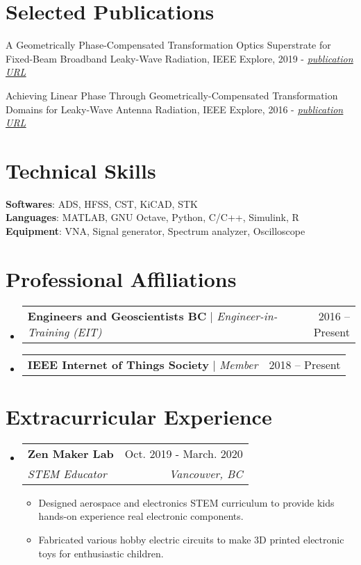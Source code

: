 \documentclass[letterpaper,11pt]{article}
\makeatletter
\newcommand{\resumeItem}[1]{
  \item\small{
    {#1 \vspace{-2pt}}
  }
}
\newcommand{\resumeSubheading}[4]{
  \vspace{-2pt}\item
    \begin{tabular*}{0.97\textwidth}[t]{l@{\extracolsep{\fill}}r}
      \textbf{#1} & #2 \\
      \textit{\small#3} & \textit{\small #4} \\
    \end{tabular*}\vspace{-7pt}
}
\newcommand{\resumeProjectHeading}[2]{
    \item
    \begin{tabular*}{0.97\textwidth}{l@{\extracolsep{\fill}}r}
      \small#1 & #2 \\
    \end{tabular*}\vspace{-7pt}
}
\newcommand{\resumeSubHeadingListStart}{\begin{itemize}[leftmargin=0.15in, label={}]}
\newcommand{\resumeSubHeadingListEnd}{\end{itemize}}
\newcommand{\resumeItemListStart}{\begin{itemize}}
\newcommand{\resumeItemListEnd}{\end{itemize}\vspace{-5pt}}
\makeatother
\begin{document}
%
\section{Selected Publications}
 \begin{itemize}[leftmargin=0.15in, label={\tiny$\bullet$}]
    \small{
    \item{A Geometrically Phase-Compensated Transformation Optics Superstrate for Fixed-Beam Broadband Leaky-Wave Radiation, IEEE Explore, 2019 - \href{https://ieeexplore.ieee.org/document/8739640}{\textit{\underline{publication URL}}}}
    \item{ Achieving Linear Phase Through Geometrically-Compensated Transformation Domains for Leaky-Wave Antenna Radiation, IEEE Explore, 2016 - \href{https://ieeexplore.ieee.org/document/7695749}{\textit{\underline{publication URL}}}}
    }
 \end{itemize}


\section{Technical Skills}
 \begin{itemize}[leftmargin=0.15in, label={}]
    \small{\item{
     \textbf{Softwares}{: ADS, HFSS, CST, KiCAD, STK} \\
     \textbf{Languages}{: MATLAB, GNU Octave, Python, C/C++, Simulink, R} \\
     \textbf{Equipment}{: VNA, Signal generator, Spectrum analyzer, Oscilloscope}
    }}
 \end{itemize}

%
\section{Professional Affiliations}
    \resumeSubHeadingListStart
      \resumeProjectHeading
          {\textbf{Engineers and Geoscientists BC} $|$ \emph{Engineer-in-Training (EIT) }}{2016 -- Present}

      \resumeProjectHeading
          {\textbf{IEEE Internet of Things Society} $|$ \emph{Member}}{2018 -- Present}

    \resumeSubHeadingListEnd
    
\section{Extracurricular Experience}
  \resumeSubHeadingListStart

    \resumeSubheading
      {Zen Maker Lab}{Oct. 2019 - March. 2020}
      {STEM Educator}{Vancouver, BC}
      \resumeItemListStart
        \resumeItem{Designed aerospace and electronics STEM curriculum to provide kids hands-on experience real electronic components.}
        \resumeItem{Fabricated various hobby electric circuits to make 3D printed electronic toys for enthusiastic children.}
      \resumeItemListEnd

    \resumeSubHeadingListEnd
    
\end{document}
